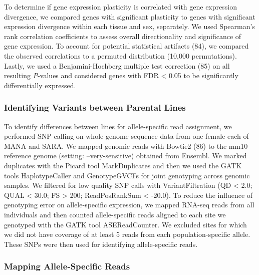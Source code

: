\documentclass[9pt,twocolumn,twoside,lineno]{pnas-new}
\begin{document}
To determine if gene expression plasticity is correlated with gene
expression divergence, we compared genes with significant plasticity to
genes with significant expression divergence within each tissue and sex,
separately. We used Spearman's rank correlation coefficients to assess
overall directionality and significance of gene expression. To account
for potential statistical artifacts (84), we compared the observed
correlations to a permuted distribution (10,000 permutations). Lastly,
we used a Benjamini-Hochberg multiple test correction (85) on all
resulting \textit{P}-values and considered genes with FDR \textless{}
0.05 to be significantly differentially expressed.

\hypertarget{identifying-variants-between-parental-lines}{%
\subsubsection*{Identifying Variants between Parental
Lines}\label{identifying-variants-between-parental-lines}}

To identify differences between lines for allele-specific read
assignment, we performed SNP calling on whole genome sequence data from
one female each of MANA and SARA. We mapped genomic reads with Bowtie2
(86) to the mm10 reference genome (setting: --very-sensitive) obtained
from Ensembl. We marked duplicates with the Picard tool MarkDuplicates
and then we used the GATK tools HaplotypeCaller and GenotypeGVCFs for
joint genotyping across genomic samples. We filtered for low quality SNP
calls with VariantFiltration (QD \textless{} 2.0; QUAL \textless{} 30.0;
FS \textgreater{} 200; ReadPosRankSum \textless{} -20.0). To reduce the
influence of genotyping error on allele-specific expression, we mapped
RNA-seq reads from all individuals and then counted allele-specific
reads aligned to each site we genotyped with the GATK tool
ASEReadCounter. We excluded sites for which we did not have coverage of
at least 5 reads from each population-specific allele. These SNPs were
then used for identifying allele-specific reads.

\hypertarget{mapping-allele-specific-reads}{%
\subsubsection*{Mapping Allele-Specific
Reads}\label{mapping-allele-specific-reads}}
\end{document}
